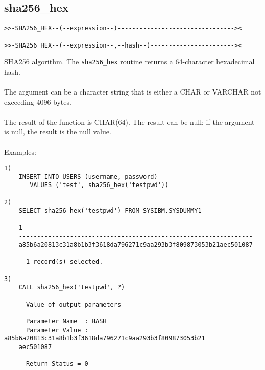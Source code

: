 \subsection{sha256\_hex} \label{sha256hex}
\begin{verbatim}
>>-SHA256_HEX--(--expression--)--------------------------------><

>>-SHA256_HEX--(--expression--,--hash--)-----------------------><
\end{verbatim}
SHA256 algorithm. The {\tt sha256\_hex} routine returns a 64-character hexadecimal hash.\\
\\
The argument can be a character string that is either a \mbox{CHAR} or \mbox{VARCHAR} not exceeding 4096 bytes.\\
\\
The result of the function is CHAR(64). The result can be null; if the argument is null, the result is the null value.\\
\\
Examples:
\begin{verbatim}
1)
    INSERT INTO USERS (username, password)
       VALUES ('test', sha256_hex('testpwd'))

2)
    SELECT sha256_hex('testpwd') FROM SYSIBM.SYSDUMMY1

    1
    ----------------------------------------------------------------
    a85b6a20813c31a8b1b3f3618da796271c9aa293b3f809873053b21aec501087

      1 record(s) selected.

3)
    CALL sha256_hex('testpwd', ?)

      Value of output parameters
      --------------------------
      Parameter Name  : HASH
      Parameter Value : a85b6a20813c31a8b1b3f3618da796271c9aa293b3f809873053b21
    aec501087

      Return Status = 0
\end{verbatim}
\newpage
\hypertarget{hsha256}{}
